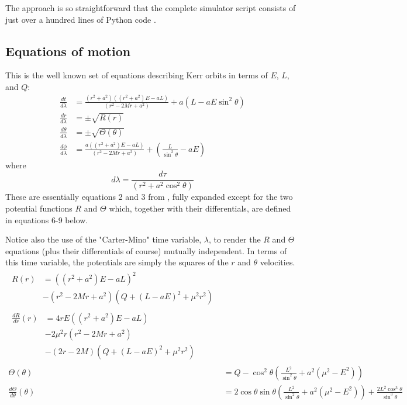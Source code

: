 \documentclass[11pt]{article}
\begin{document}
The approach is so straightforward that the complete simulator script consists of just over a hundred lines of Python code \cite{m4r35n357}.

\subsection {Equations of motion}

This is the well known set of equations describing Kerr orbits in terms of $E$, $L$, and $Q$:
\begin{align}
\frac{d t}{d \lambda} &= \frac{(r^2 + a^2) \left((r^2 + a^2) E - aL \right)} {(r^2 - 2Mr  + a^2)} + a(L - aE \sin^2 \theta) \\
\frac{d r}{d \lambda} &= \pm \sqrt {R(r)} \\
\frac{d \theta}{d \lambda} &= \pm \sqrt {\Theta (\theta)} \\
\frac{d \phi}{d \lambda} &= \frac{a \left((r^2 + a^2) E - aL \right)} {(r^2 - 2Mr  + a^2)} + \left(\frac {L} {\sin^2 \theta} -aE \right)
\end{align}
where
\begin{equation}
d \lambda = \frac {d \tau} {(r^2 + a^2 \cos^2\theta)}
\end{equation}
These are essentially equations 2 and 3 from \cite{wilkins}, fully expanded except for the two potential functions $R$ and $\Theta$ which, together with their differentials, are defined in equations 6-9 below.

Notice also the use of the "Carter-Mino" time variable, $\lambda$, to render the $R$ and $\Theta$ equations (plus their differentials of course) mutually independent.  In terms of this time variable, the potentials are simply the squares of the $r$ and $\theta$ velocities.
\begin{align}
   \begin{split}
    R(r) &= \left((r^2 + a^2) E - aL \right)^2 \label{eq:1}\\
    &- (r^2 - 2Mr  + a^2) \left(Q + ( L - aE)^2 + \mu^2 r^2 \right)
   \end{split}\\
   \begin{split}
    \frac{d R}{d r} (r) &= 4rE \left((r^2 + a^2)E - aL \right) \label{eq:2}\\
    &- 2\mu^2r(r^2 - 2Mr  + a^2)\\
    &- (2r - 2M) \left(Q + ( L - aE)^2 + \mu^2 r^2 \right)
   \end{split}\\
  \Theta (\theta) &= Q - {\cos^2 \theta } \left( \frac{L^2}{\sin^2 \theta } + a^2( \mu^2 - E^2) \right) \label{eq:3}\\
  \frac{d \Theta}{d \theta} (\theta) &= 2 \cos \theta \sin \theta \left(\frac{L^2} {\sin^2 \theta } + a^2(\mu^2 - E^2) \right) +\frac{2 L^2 \cos^3 \theta } {\sin^3 \theta } \label{eq:4}
\end{align}
\end{document}
